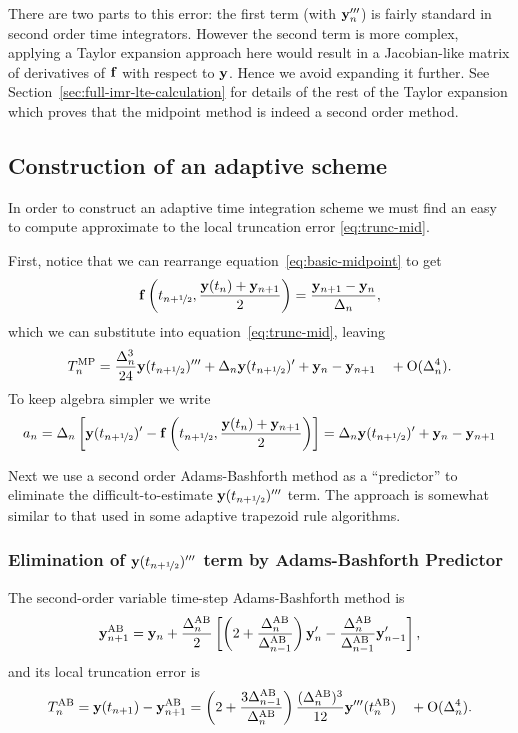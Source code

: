 There are two parts to this error: the first term (with $\mathbf{y}'''_n$) is fairly standard in second order time integrators.
However the second term is more complex, applying a Taylor expansion approach here would result in a Jacobian-like matrix of derivatives of ${\mathbf{f}}$ with respect to $\mathbf{y}$.
Hence we avoid expanding it further.
See Section~\ref{sec:full-imr-lte-calculation} for details of the rest of the Taylor expansion which proves that the midpoint method is indeed a second order method.



\subsection{Construction of an adaptive scheme}

In order to construct an adaptive time integration scheme we must find an easy to compute approximate to the local truncation error \eqref{eq:trunc-mid}.

First, notice that we can rearrange equation~\eqref{eq:basic-midpoint} to get
\begin{equation}
  {\mathbf{f}}\left( t_{n+\nicefrac{1}{2}}, \frac{\mathbf{y}(t_n) + \mathbf{y}_{n+1}}{2} \right) = \frac{\mathbf{y}_{n+1} - \mathbf{y}_n}{\Delta_{n}},
\end{equation}
which we can substitute into equation~\eqref{eq:trunc-mid}, leaving
\begin{equation}
  T_n^{\text{MP}} = \frac{\Delta_{n}^3}{24} \mathbf{y}(t_{n+\nicefrac{1}{2}})'''  + \Delta_{n} \mathbf{y}(t_{n+\nicefrac{1}{2}})' + \mathbf{y}_n - \mathbf{y}_{n+1}
  \quad + \text{O}(\Delta_{n}^4).
\end{equation}
To keep algebra simpler we write
\begin{equation}
   a_n = \Delta_{n}  \left[ \mathbf{y}(t_{n+\nicefrac{1}{2}})'
  - {\mathbf{f}}\left( t_{n+\nicefrac{1}{2}}, \frac{\mathbf{y}(t_n) + \mathbf{y}_{n+1}}{2} \right) \right] =  \Delta_{n} \mathbf{y}(t_{n+\nicefrac{1}{2}})' + \mathbf{y}_n - \mathbf{y}_{n+1}
\end{equation}

Next we use a second order Adams-Bashforth method as a ``predictor'' to eliminate the difficult-to-estimate $\mathbf{y}(t_{n+\nicefrac{1}{2}})'''$ term.
The approach is somewhat similar to that used in some adaptive trapezoid rule algorithms.\cite[p.707]{Gresho-Sani}

\subsubsection{Elimination of $\mathbf{y}(t_{n+\nicefrac{1}{2}})'''$ term by Adams-Bashforth Predictor}
The second-order variable time-step Adams-Bashforth method is\cite[p.267]{Gresho-Sani}
\begin{equation}
  \mathbf{y}_{n+1}^{\text{AB}} = \mathbf{y}_n + \frac{\Delta_{n}^{\text{AB}}}{2} \left[
    \left (2 + \frac{\Delta_{n}^{\text{AB}}}{\Delta_{n-1}^{\text{AB}}} \right) \mathbf{y}'_n
    - \frac{\Delta_{n}^{\text{AB}}}{\Delta_{n-1}^{\text{AB}}} \mathbf{y}'_{n-1}
    \right],
  \label{eq:AB2}
\end{equation}
and its local truncation error is\cite[p.267]{Gresho-Sani}
\begin{equation}
  T_n^{\text{AB}} = \mathbf{y}(t_{n+1}) - \mathbf{y}_{n+1}^{\text{AB}}
  = \left( 2 + \frac{3 \Delta_{n-1}^{\text{AB}}}{\Delta_{n}^{\text{AB}}} \right) \frac{(\Delta_{n}^{\text{AB}})^3}{12} \mathbf{y}'''(t_n^{\text{AB}})
  \quad + \text{O}(\Delta_{n}^4).
  \label{eq:AB2LTE}
\end{equation}

